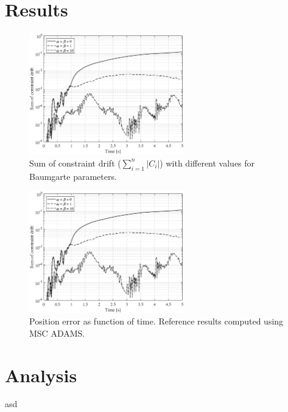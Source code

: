 \documentclass{article}
\begin{document}
\section*{Results}
\begin{figure}[h!]
	\centering
	\includegraphics[width=0.6\textwidth]{constraintdrift.eps}
	\caption{Sum of constraint drift ($\sum_{i=1}^{n} |C_i| $) with different values for Baumgarte parameters.\label{fig:constraintdrift}}
\end{figure}

\begin{figure}[h!]
	\centering
	\includegraphics[width=0.6\textwidth]{constraintdrift.eps}
	\caption{Position error as function of time. Reference results computed using MSC ADAMS.\label{fig:comparison}}
\end{figure}


\section*{Analysis}
asd
\end{document}
